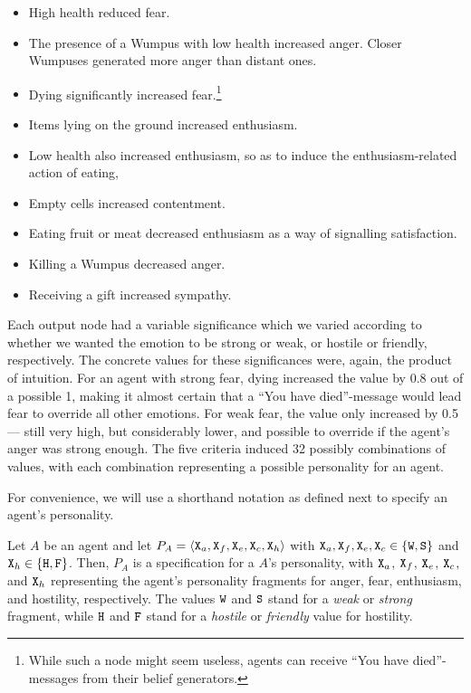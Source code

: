 \begin{itemize}
	\item High health reduced fear.
	\item The presence of a Wumpus with low health increased anger. Closer Wumpuses generated more anger than distant ones.
	\item Dying significantly increased fear.\footnote{While such a node might seem useless, agents can receive ``You have died''-messages from their belief generators.}
	\item Items lying on the ground increased enthusiasm.
	\item Low health also increased enthusiasm, so as to induce the enthusiasm-related action of eating,
	\item Empty cells increased contentment.
	\item Eating fruit or meat decreased enthusiasm as a way of signalling satisfaction.
	\item Killing a Wumpus decreased anger.
	\item Receiving a gift increased sympathy.
\end{itemize}

Each output node had a variable significance which we varied according to whether we wanted the emotion to be strong or weak, or hostile or friendly, respectively. The concrete values for these significances were, again, the product of intuition. For an agent with strong fear, dying increased the value by 0.8 out of a possible 1, making it almost certain that a ``You have died''-message would lead fear to override all other emotions. For weak fear, the value only increased by 0.5 --- still very high, but considerably lower, and possible to override if the agent's anger was strong enough. The five criteria induced 32 possibly combinations of values, with each combination representing a possible personality for an agent.

For convenience, we will use a shorthand notation as defined next to specify an agent's personality.

\begin{definition}\label{def:personality}
   Let $A$ be an agent and let $P_A = \langle \mathtt{X}_a, \mathtt{X}_f, \mathtt{X}_e, \mathtt{X}_c, \mathtt{X}_h \rangle$ with $\mathtt{X}_a, \mathtt{X}_f, \mathtt{X}_e, \mathtt{X}_c \in \{ \mathtt{W}, \mathtt{S} \}$ and $\mathtt{X}_h \in \{ \mathtt{H}, \mathtt{F} \}$. Then, $P_A$ is a specification for a $A$'s personality, with $\mathtt{X}_a$, $\mathtt{X}_f$, $\mathtt{X}_e$, $\mathtt{X}_c$, and $\mathtt{X}_h$ representing the agent's personality fragments for anger, fear, enthusiasm, and hostility, respectively. The values $\mathtt{W}$ and $\mathtt{S}$ stand for a \emph{weak} or \emph{strong} fragment, while $\mathtt{H}$ and $\mathtt{F}$ stand for a \emph{hostile} or \emph{friendly} value for hostility.
\end{definition}

